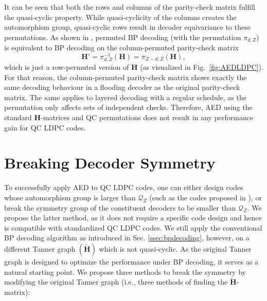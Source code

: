 \documentclass[conference]{IEEEtran}
\newcommand\new[1]{#1}
\begin{document}
\begin{NoHyper}
It can be seen that both the rows and columns of the parity-check matrix fulfill the quasi-cyclic property. While quasi-cyclicity of the columns creates the automorphism group, quasi-cyclic rows result in decoder equivariance to these permutations. As shown in \cite{Chen_Cyclic_LDPC_AED}, permuted \ac{BP} decoding (with the permutation $\pi_{d,Z}$) is equivalent to \ac{BP} decoding on the column-permuted parity-check matrix
\begin{equation}
    \new{\mathbf{H}'} = \pi_{d,Z}^{-1}(\mathbf{H}) = \pi_{Z-d,Z}(\mathbf{H}), 
\end{equation}
which is just a row-permuted version of $\mathbf{H}$ (as visualized in Fig.~\ref{fig:AEDLDPC}). For that reason, the column-permuted parity-check matrix shows exactly the same decoding behaviour in a flooding decoder as the original parity-check matrix. \new{The same applies to layered decoding with a regular schedule, as the permutation only affects sets of independent checks.}
Therefore, \ac{AED} using the standard $\mathbf{H}$-matrices and \ac{QC} permutations does not result in any performance gain for \ac{QC} \ac{LDPC} codes.


\section{Breaking Decoder Symmetry}
To successfully apply \ac{AED} to \ac{QC} \ac{LDPC} codes, one can either design codes whose automorphism group is larger than $\mathcal{Q}_Z$ (such as the codes proposed in \cite{Chen_Cyclic_LDPC_AED}), or break the symmetry group of the constituent decoders to be smaller than $\mathcal{Q}_Z$. We propose the latter method, as it does not require a specific code design and hence is compatible with standardized \ac{QC} \ac{LDPC} codes. We still apply the conventional \ac{BP} decoding algorithm as introduced in Sec. \ref{ssec:bpdecoding}, however, on a different Tanner graph $(\tilde{\mathbf{H}})$ which is not quasi-cyclic. As the original Tanner graph is designed to optimize the performance under \ac{BP} decoding, it serves as a natural starting point. We propose three methods to break the symmetry by modifying the original Tanner graph (i.e., three methods of finding the $\tilde{\mathbf{H}}$-matrix):


\end{NoHyper}
\end{document}
